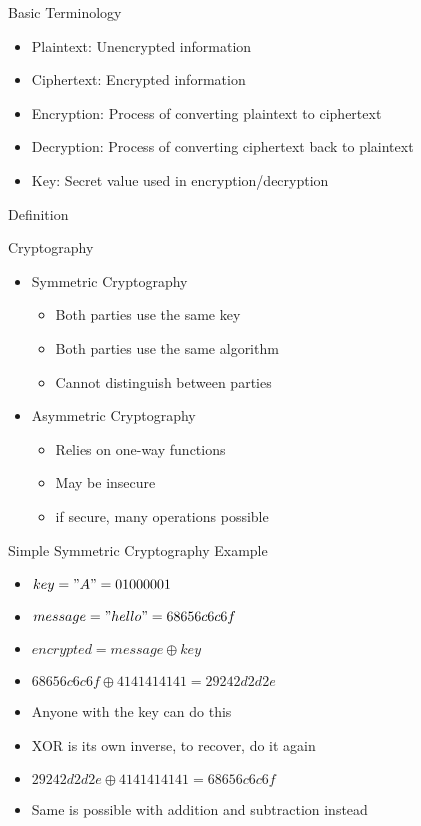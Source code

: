 \begin{withoutheadline}
\begin{frame}{Basic Terminology}
\begin{itemize}
    \item Plaintext: Unencrypted information
    \item Ciphertext: Encrypted information
    \item Encryption: Process of converting plaintext to ciphertext
    \item Decryption: Process of converting ciphertext back to plaintext
    \item Key: Secret value used in encryption/decryption
\end{itemize}
\end{frame}


\begin{frame}{Definition}
\end{frame}

\begin{frame}{Cryptography}
    \begin{itemize}
        \item Symmetric Cryptography
        \begin{itemize}
        \item Both parties use the same key
        \item Both parties use the same algorithm
        \item Cannot distinguish between parties
        \end{itemize}
        \item Asymmetric Cryptography
        \begin{itemize}
        \item Relies on one-way functions
        \item May be insecure
        \item if secure, many operations possible
        \end{itemize}
    \end{itemize}
\end{frame}

\begin{frame}{Simple Symmetric Cryptography Example}
    \begin{itemize}
        \item $key = "A" = 01000001$
        \item $message = "hello" = 68 65 6c 6c 6f$ 
        \item $encrypted = message \oplus key$
        \item $68 65 6c 6c 6f \oplus 41 41 41 41 41 = 29 24 2d 2d 2e$
        \item Anyone with the key can do this
        \item XOR is its own inverse, to recover, do it again
        \item $29 24 2d 2d 2e \oplus 41 41 41 41 41 = 68 65 6c 6c 6f$
        \item Same is possible with addition and subtraction instead 
    \end{itemize}
\end{frame}


\end{withoutheadline}
